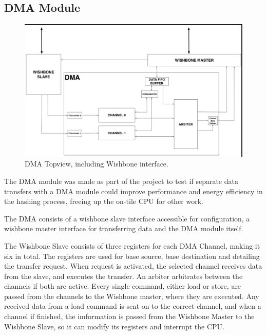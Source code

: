 \subsection{DMA Module}

\begin{figure}[htb]
    \centering
    \includegraphics[width=1.0\textwidth]{Figures/DMA/DMATopview}
    \caption{DMA Topview, including Wishbone interface.}
    \label{fig:DMATop}
\end{figure}

The DMA module was made as part of the project to test if separate data transfers with a DMA module could improve performance and energy efficiency in the hashing process, freeing up the on-tile CPU for other work.

The DMA consists of a wishbone slave interface accessible for configuration, a wishbone master
interface for transferring data and the DMA module itself.


The Wishbone Slave consists of three registers for each DMA Channel, making it six in total.
The registers are used for base source, base destination and detailing the transfer request.
When request is activated, the selected channel receives data from the slave, and executes the transfer.
An arbiter arbitrates between the channels if both are active.
Every single command, either load or store, are passed from the channels to the Wishbone master, where they are executed.
Any received data from a load command is sent on to the correct channel, and when a channel if finished, the imformation is passed from the Wishbone Master to the Wishbone Slave, so it can modify its registers and interrupt the CPU. 

